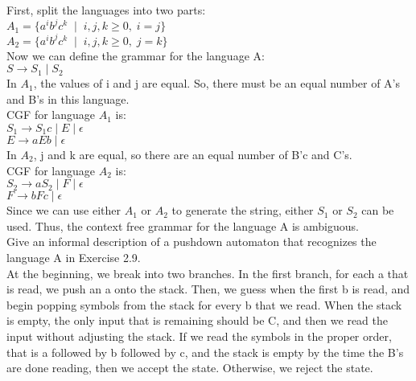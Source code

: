 \documentclass[12pt]{article}
\begin{document}
\noindent
First, split the languages into two parts: \\
$A_1 = \{ a^i b^j c^k \; \; | \; \; i,j,k \geq 0, \; i = j \}$ \\
$A_2 = \{ a^i b^j c^k \; \; | \; \; i,j,k \geq 0, \; j= k \}$ \\

\noindent
Now we can define the grammar for the language A: \\
$S \rightarrow S_1 \; | \; S_2$ \\

\noindent
In $A_1$, the values of i and j are equal. So, there must be an equal number
of A's and B's in this language. \\

\noindent
CGF for language $A_1$ is: \\
$S_1 \rightarrow S_1 c \; | \; E \; | \; \epsilon $ \\
$E \rightarrow aEb \; | \; \epsilon  $ \\

\noindent
In $A_2$, j and k are equal, so there are an equal number of B'c and C's. \\

\noindent
CGF for language $A_2$ is: \\
$S_2 \rightarrow a S_2 \; | \; F \; | \; \epsilon $ \\
$F \rightarrow bFc \; | \; \epsilon  $ \\

\noindent
Since we can use either $A_1$ or $A_2$ to generate the string, either $S_1$ or
$S_2$ can be used. Thus, the context free grammar for the language A is ambiguous. \\


\pagebreak
{} Give an informal description of a pushdown automaton that recognizes the language A in Exercise 2.9. \\

At the beginning, we break into two branches. In the first branch, for each a that is read,
we push an a onto the stack. Then, we guess when the first b is read, and begin popping
symbols from the stack for every b that we read. When the stack is empty, the only input
that is remaining should be C, and then we read the input without adjusting the stack.
If we read the symbols in the proper order, that is a followed by b followed by c,
and the stack is empty by the time the B's are done reading, then we accept the state.
Otherwise, we reject the state. \\
\end{document}
